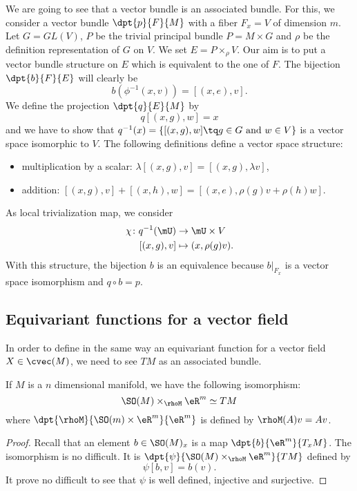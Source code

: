 We are going to see that a vector bundle is an associated bundle. For this, we consider a vector bundle $\dpt{p}{F}{M}$ with a fiber $F_x=V$ of dimension $m$. Let $G=GL(V)$, $P$ be the trivial principal bundle $P=M\times G$ and $\rho$ be the definition representation of $G$ on $V$. We set $E=P\times_{\rho} V$. Our aim is to put a vector bundle structure on $E$ which is equivalent to the one of $F$. The bijection $\dpt{b}{F}{E}$ will clearly be
\begin{equation}
	b(\phi^{-1}(x,v))=[(x,e),v].
\end{equation}
We define the projection $\dpt{q}{E}{M}$ by
\[
	q[(x,g),w]=x
\]
and we have to show that  $q^{-1}(x)=\{  [(x,g),w]\tq g\in G \textrm{ and } w\in V  \}$ is a vector space isomorphic to $V$. The following definitions define a vector space structure:
\begin{itemize}
	\item multiplication by a scalar: $\lambda[(x,g),v]=[(x,g),\lambda v]$,
	\item addition: $[(x,g),v]+[(x,h),w]=[(x,e),\rho(g)v+\rho(h)w]$.
\end{itemize}
As local trivialization map, we consider
\begin{equation}
	\begin{aligned}
		\chi\colon q^{-1}(\mU) & \to \mU\times V      \\
		[(x,g),v]              & \mapsto(x,\rho(g)v).
	\end{aligned}
\end{equation}
With this structure, the bijection $b$ is an equivalence because $b|_{F_x}$ is a vector space isomorphism and $q\circ b=p$.

\subsection{Equivariant functions for a vector field}	\label{equivvec}

In order to define in the same way an equivariant function for a vector field $X\in\cvec(M)$, we need to see $TM$ as an associated bundle.

\begin{proposition}
	If $M$ is a $n$ dimensional manifold, we have the following isomorphism:
	\[
		\SO(M)\times_{\rhoM}\eR^m\simeq TM
	\]
	where $\dpt{\rhoM}{\SO(m)\times\eR^m}{\eR^m}$ is defined by $\rhoM(A)v=Av$.
\end{proposition}
\begin{proof}
	Recall that an element $b\in \SO(M)_x$ is a map $\dpt{b}{\eR^m}{T_xM}$. The isomorphism is no difficult. It is $\dpt{\psi}{\SO(M)\times_{\rhoM}\eR^m}{TM}$ defined by
	\[\psi[b,v]=b(v).\]
	It prove no difficult to see that $\psi$ is well defined, injective and surjective.
\end{proof}

